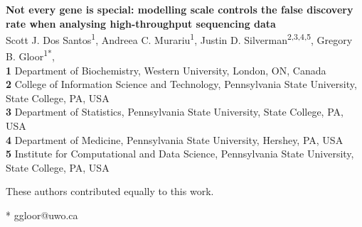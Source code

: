 \documentclass[10pt,letterpaper]{article}
\begin{document}
\vspace*{0.2in}

\begin{flushleft}
{\Large
\textbf{Not every gene is special: modelling scale controls the false discovery rate when analysing high-throughput sequencing data} %
}
\newline
\\
Scott J. Dos Santos\textsuperscript{1\Yinyang},
Andreea C. Murariu\textsuperscript{1\Yinyang},
Justin D. Silverman\textsuperscript{2,3,4,5},
Gregory B. Gloor\textsuperscript{1*},
\\
\bigskip
\textbf{1} Department of Biochemistry, Western University, London, ON, Canada
\\
\textbf{2} College of Information Science and Technology, Pennsylvania State University, State College, PA, USA
\\
\textbf{3} Department of Statistics, Pennsylvania State University, State College, PA, USA
\\
\textbf{4} Department of Medicine, Pennsylvania State University, Hershey, PA, USA
\\
\textbf{5} Institute for Computational and Data Science, Pennsylvania State University, State College, PA, USA
\\
\bigskip

% 
%
\Yinyang These authors contributed equally to this work.





* ggloor@uwo.ca

\end{flushleft}
\end{document}
